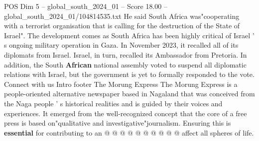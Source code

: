 \begin{textsample}{POS Dim 5 – global\_south\_2024\_01 – Score 18.00 – global\_south\_2024\_01/104814535.txt}
He said South Africa was"cooperating with a terrorist organisation that is calling for the destruction of the State of Israel".
The development comes as South Africa has been highly critical of Israel ' s ongoing military operation in Gaza.
In November 2023, it recalled all of its diplomats from Israel.
Israel, in turn, recalled its Ambassador from Pretoria.
In addition, the South \textbf{African} national assembly voted to suspend all diplomatic relations with Israel, but the government is yet to formally responded to the vote.
Connect with us Intro footer The Morung Express The Morung Express is a people-oriented alternative newspaper based in Nagaland that was conceived from the Naga people ' s historical realities and is guided by their voices and experiences.
It emerged from the well-recognized concept that the core of a free press is based on"qualitative and investigative"journalism.
Ensuring this is \textbf{essential} for contributing to an @ @ @ @ @ @ @ @ @ @ affect all spheres of life.

\end{textsample}
